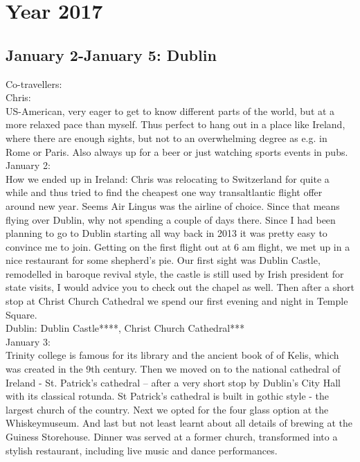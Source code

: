\chapter{Year 2017}
\label{2017}

\section{January 2-January 5: Dublin}
\label{2017: Ireland}

Co-travellers: \\
Chris:\\
US-American, very eager to get to know different parts of the world, but at a more relaxed pace than myself. Thus perfect to hang out in a place like Ireland, where there are enough sights, but not to an overwhelming degree as e.g. in Rome or Paris. Also always up for a beer or just watching sports events in pubs.\\

January 2:\\
How we ended up in Ireland: Chris was relocating to Switzerland for quite a while and thus tried to find the cheapest one way transaltlantic flight offer around new year. Seems Air Lingus was the airline of choice. Since that means flying over Dublin, why not spending a couple of days there. Since I had been planning to go to Dublin starting all way back in 2013 it was pretty easy to convince me to join. Getting on the first flight out at 6 am flight, we met up in a nice restaurant for some shepherd's pie. Our first sight was Dublin Castle, remodelled in baroque revival style, the castle is still used by Irish president for state visits, I would advice you to check out the chapel as well. Then after a short stop at Christ Church Cathedral we spend our first evening and night in Temple Square.\\

Dublin: Dublin Castle****, Christ Church Cathedral***\\

January 3:\\
Trinity college is famous for its library and the ancient book of of Kelis, which was created in the 9th century.
Then we moved on to the national cathedral of Ireland - St. Patrick's cathedral -- after a very short stop by Dublin's City Hall with its classical rotunda. St Patrick's cathedral is built in gothic style - the largest church of the country. Next we opted for the four glass option at the Whiskeymuseum. And last but not least learnt about all details of brewing at the Guiness Storehouse. Dinner was served at a former church, transformed into a stylish restaurant, including live music and dance performances.\\

